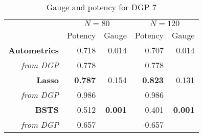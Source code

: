 \begin{table}[htbp]
  \centering
 
    \begin{tabular}{r|r|r|r|r}

         & \multicolumn{2}{|c|}{$N=80$} & \multicolumn{2}{|c}{$N=120$}  \\
            & Potency           & Gauge           & Potency            & Gauge           \\
          \hline
    \textbf{Autometrics} & 0.718 & 0.014 & 0.707 & 0.014 \\
    \textit{from DGP} & 0.778 &    & 0.778 &  \\
    \hline
    \textbf{Lasso} & \textbf{0.787} & 0.154 & \textbf{0.823} & 0.131 \\
    \textit{from DGP} & 0.986 &    & 0.986 &  \\
    \hline
    \textbf{BSTS} & 0.512 & \textbf{0.001} & 0.401 & \textbf{0.001} \\
    \textit{from DGP} & 0.657 &   & -0.657 &  \\

    \end{tabular}%
     \caption{Gauge and potency for DGP 7}
  \label{DGP7GP}%
\end{table}%


